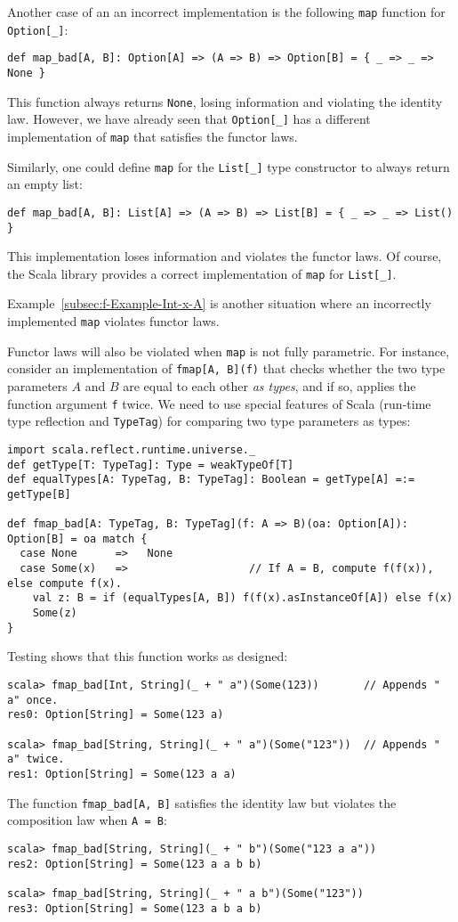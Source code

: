 Another case of an an incorrect implementation is the following \lstinline!map!
function for \lstinline!Option[_]!:
\begin{lstlisting}
def map_bad[A, B]: Option[A] => (A => B) => Option[B] = { _ => _ => None }
\end{lstlisting}
This function always returns \lstinline!None!, losing information
and violating the identity law. However, we have already seen that
\lstinline!Option[_]! has a different implementation of \lstinline!map!
that satisfies the functor laws.

Similarly, one could define \lstinline!map! for the \lstinline!List[_]!
type constructor to always return an empty list:
\begin{lstlisting}
def map_bad[A, B]: List[A] => (A => B) => List[B] = { _ => _ => List() }
\end{lstlisting}
This implementation loses information and violates the functor laws.
Of course, the Scala library provides a correct implementation of
\lstinline!map! for \lstinline!List[_]!.

Example~\ref{subsec:f-Example-Int-x-A} is another situation where
an incorrectly implemented \lstinline!map! violates functor laws.

Functor laws will also be violated when \lstinline!map! is not fully
parametric. For instance, consider an implementation of \lstinline!fmap[A, B](f)!
that checks whether the two type parameters $A$ and $B$ are equal
to each other \emph{as types}, and if so, applies the function argument
\lstinline!f! twice. We need to use special features of Scala (run-time
type reflection and \lstinline!TypeTag!)
for comparing two type parameters as types:
\begin{lstlisting}
import scala.reflect.runtime.universe._
def getType[T: TypeTag]: Type = weakTypeOf[T]
def equalTypes[A: TypeTag, B: TypeTag]: Boolean = getType[A] =:= getType[B]

def fmap_bad[A: TypeTag, B: TypeTag](f: A => B)(oa: Option[A]): Option[B] = oa match {
  case None      =>   None
  case Some(x)   =>                   // If A = B, compute f(f(x)), else compute f(x).
    val z: B = if (equalTypes[A, B]) f(f(x).asInstanceOf[A]) else f(x)
    Some(z)
}
\end{lstlisting}
Testing shows that this function works as designed:
\begin{lstlisting}
scala> fmap_bad[Int, String](_ + " a")(Some(123))       // Appends " a" once.
res0: Option[String] = Some(123 a)

scala> fmap_bad[String, String](_ + " a")(Some("123"))  // Appends " a" twice.
res1: Option[String] = Some(123 a a)
\end{lstlisting}
The function \lstinline!fmap_bad[A, B]! satisfies the identity law
but violates the composition law when \lstinline!A = B!:
\begin{lstlisting}
scala> fmap_bad[String, String](_ + " b")(Some("123 a a"))
res2: Option[String] = Some(123 a a b b)

scala> fmap_bad[String, String](_ + " a b")(Some("123"))
res3: Option[String] = Some(123 a b a b)
\end{lstlisting}

